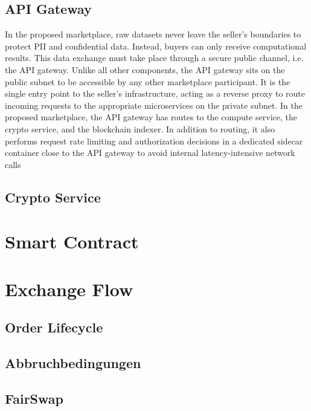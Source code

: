 \subsection{API Gateway}
\label{subsec:api_gw}

In the proposed marketplace, raw datasets never leave the seller's boundaries to protect PII and confidential data. Instead, buyers can only receive computational results. This data exchange must take place through a secure public channel, i.e. the API gateway. Unlike all other components, the API gateway sits on the public subnet to be accessible by any other marketplace participant. It is the single entry point to the seller's infrastructure, acting as a reverse proxy to route incoming requests to the appropriate microservices on the private subnet. In the proposed marketplace, the API gateway has routes to the compute service, the crypto service, and the blockchain indexer. In addition to routing, it also performs request rate limiting and authorization decisions in a dedicated sidecar container close to the API gateway to avoid internal latency-intensive network calls

\subsection{Crypto Service}
\label{subsec:crypto}

\section{Smart Contract}
\label{section:smart contract}

\section{Exchange Flow}
\label{section:exchange}

\subsection{Order Lifecycle}
\label{subsection:lifecycle}

\subsection{Abbruchbedingungen}
\label{subsection:cancel}

\subsection{FairSwap}
\label{subsection:fairswap}

